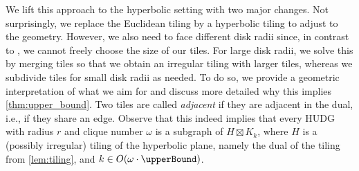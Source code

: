 \documentclass[11pt]{article}
\newtheorem{theorem}{Theorem}
\providecommand{\todo}[2][]{}
\newcommand{\calP}{\ensuremath{\mathcal{P}}\xspace}
\begin{document}
%
We lift this approach to the hyperbolic setting with two major changes.
Not surprisingly, we replace the Euclidean tiling by a hyperbolic tiling to adjust to the geometry.
However, we also need to face different disk radii since, in contrast to \cite{dvorak_notes_2021}, we cannot freely choose the size of our tiles.
For large disk radii, we solve this by merging tiles so that we obtain an irregular tiling with larger tiles, whereas we subdivide tiles for small disk radii as needed.
%
To do so, we provide a geometric interpretation of what we aim for and discuss more detailed why this implies \cref{thm:upper_bound}.
Two tiles are called \emph{adjacent} if they are adjacent in the dual, i.e., if they share an edge.
%
%
\tiling*
%
Observe that this indeed implies that every HUDG with radius $ r $ and clique number $ \omega $ is a subgraph of $ H \boxtimes K_k $, where $ H $ is a (possibly irregular) tiling of the hyperbolic plane, namely the dual of the tiling from \cref{lem:tiling}, and $ k \in O(\omega \cdot \upperBound) $.
\end{document}
